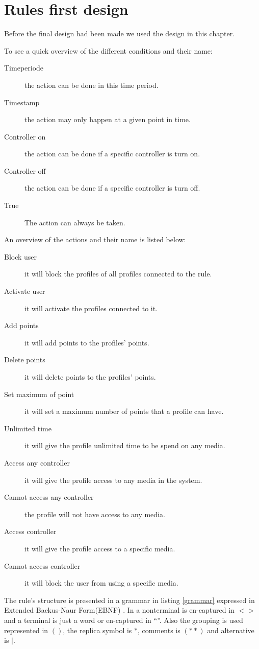\chapter{Rules first design}
\label{appendixFirstRuleDesign}
Before the final design had been made we used the design in this chapter.

To see a quick overview of the different conditions and their name:
\begin{description}
	\item[Timeperiode] the action can be done in this time period. 
	\item[Timestamp] the action may only happen at a given point in time. 
	\item[Controller on] the action can be done if a specific controller is turn on. 
	\item[Controller off] the action can be done if a specific controller is turn off. 
	\item[True] The action can always be taken.
\end{description}

An overview of the actions and their name is listed below:

\begin{description}
	\item[Block user] it will block the profiles of all profiles connected to the rule.
	\item[Activate user] it will activate the profiles connected to it. 
	\item[Add points] it will add points to the profiles' points.
	\item[Delete points]  it will delete points to the profiles' points.  
	\item[Set maximum of point] it will set a maximum number of points that a profile can have. 
	\item[Unlimited time] it will give the profile unlimited time to be spend on any media. 
	\item[Access any controller] it will give the profile access to any media in the system. 
	\item[Cannot access any controller] the profile will not have access to any media. 
	\item[Access controller] it will give the profile access to a specific media. 
	\item[Cannot access controller] it will block the user from using a specific media. 
\end{description}

The rule's structure is presented in a grammar in listing	\ref{grammar} expressed in Extended Backus-Naur Form(EBNF) \citep{CoPL}.
In a nonterminal is en-captured in $<>$ and a terminal is just a word or en-captured in ``''. 
Also the grouping is used represented in $()$, the replica symbol is $*$, comments is $(**)$ and alternative is $|$. 

